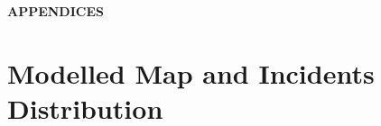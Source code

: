 \documentclass[paper=A4, 12pt, mathscr]{report}
\begin{document}
	\appendix
	\newpage
	\begin{center}
		{\bf\large \scshape APPENDICES} \vskip 30pt
	\end{center}
	\section{Modelled Map and Incidents Distribution}
		
\end{document}
